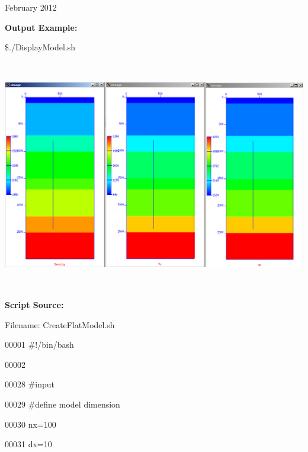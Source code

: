 \documentclass{article}
\begin{document}
\vspace{4pt}
\leftskip=18pt
February 2012 

\vspace{16pt}
\leftskip=0pt
\textbf{Output Example:}

\vspace{4pt}
\$./DisplayModel.sh

\vspace{16pt}
\includegraphics[width=463pt, height=287pt, keepaspectratio=true]{LatihanVSPsu-fig001.png}

\pagebreak{}

\vspace{28pt}
\textbf{Script Source:}

\vspace{4pt}
Filename: CreateFlatModel.sh

\vspace{4pt}
00001 \#!/bin/bash

\vspace{4pt}
00002 

\vspace{4pt}
00028 \#input

\vspace{4pt}
00029 \#define model dimension

\vspace{4pt}
00030 nx=100

\vspace{4pt}
00031 dx=10
\end{document}
